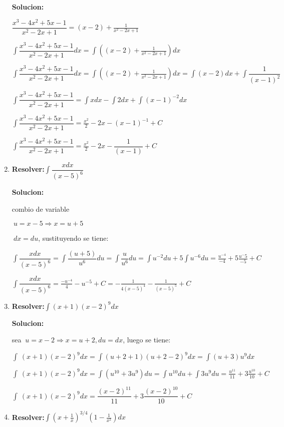 \documentclass[10pt,a4paper]{book}
\newcommand{\ds}{\displaystyle}
\begin{document}
\begin{enumerate}
        \textbf{Solucion:}

        $\ds\dfrac{x^3-4x^2+5x-1}{x^2-2x+1}=(x-2)+\frac{1}{x^2-2x+1}$
        
        $\ds\int\dfrac{x^3-4x^2+5x-1}{x^2-2x+1}dx=\int\left((x-2)+\frac{1}{x^2-2x+1}\right)dx$

        $\ds\int\dfrac{x^3-4x^2+5x-1}{x^2-2x+1}dx=\int\left((x-2)+\frac{1}{x^2-2x+1}\right)dx=\int(x-2)dx
        +\int \dfrac{1}{(x-1)^2}$ 

        $\ds\int\dfrac{x^3-4x^2+5x-1}{x^2-2x+1}=\int xdx-\int 2dx+\int(x-1)^{-2}dx$

        $\ds\int\dfrac{x^3-4x^2+5x-1}{x^2-2x+1}=\frac{x^2}{2}-2x-(x-1)^{-1}+C$ 

        $\ds\int\dfrac{x^3-4x^2+5x-1}{x^2-2x+1}=\frac{x^2}{2}-2x-\dfrac{1}{(x-1)}+C$
        
    \vspace{0.5cm}
    \item \textbf{Resolver:}$\ds\int\dfrac{xdx}{(x-5)^6}$
    
        \textbf{Solucion:}

        combio de variable

        $\ds\ u=x-5\Rightarrow x=u+5$

        $\ds\ dx=du$, sustituyendo se tiene:

        $\ds\int\dfrac{xdx}{(x-5)^6}=\ds\int\dfrac{(u+5)}{u^6}du=\int\dfrac{u}{u^6}du=\int u^{-2}du+5
        \int u^{-6}du=\frac{u^{-4}}{-4}+5\frac{u^-5}{-5}+C $

        $\ds\int\dfrac{xdx}{(x-5)^6}=\frac{-u^{-4}}{4}-u^{-5}+C=-\frac{1}{4(x-5)^4}-\frac{1}{(x-5)^5}+C$
        
    \vspace{0.5cm}
    \item \textbf{Resolver:}$\ds\int (x+1)(x-2)^9dx$
    
        \textbf{Solucion:}

        sea $\ds\ u=x-2 \Rightarrow x=u+2,du=dx$, luego se tiene:

        $\ds\int\ (x+1)(x-2)^9dx=\int(u+2+1)(u+2-2)^9dx=\int(u+3)u^9dx$

        $\ds\int\ (x+1)(x-2)^9dx=\int(u^10+3u^9)du=\int u^10du+\int3u^9du=\frac{u^11}{11}+3\frac{u^10}{10}+C$
        
        $\ds\int\ (x+1)(x-2)^9dx=\dfrac{(x-2)^11}{11}+3\dfrac{(x-2)^10}{10}+C$

    \vspace{0.5cm}
    \item \textbf{Resolver:}$\ds\int\left(x+\frac{1}{x} \right)^{3/4}\left(1-\frac{1}{x^2} \right)dx$
    

\end{enumerate}
\end{document}
